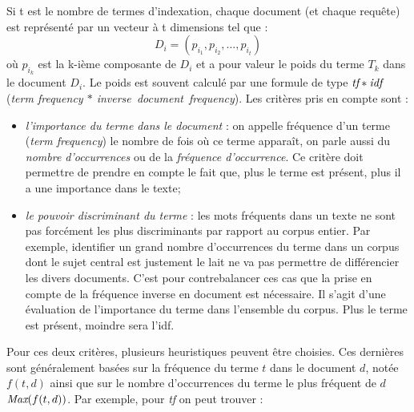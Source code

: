 Si t est le nombre de termes d'indexation, chaque document (et chaque
requête) est représenté par un vecteur à t dimensions tel que :
\begin{equation}
  \label{eq:vect-salton}
  D_i = (p_{i_1}, p_{i_2}, \ldots, p_{i_t})
\end{equation}
où $p_{i_k}$ est la k-ième composante de $D_i$ et a pour valeur le
poids du terme $T_k$ dans le document $D_i$. Le poids est souvent
calculé par une formule de type $\emph{tf}*\emph{idf}$ (\emph{term
  frequency $*$ inverse~document~frequency}). Les critères pris en compte sont :
\begin{itemize}
  
\item \emph{l'importance du terme dans le document} : on appelle
  fréquence d'un terme (\emph{term frequency}) le nombre de fois où ce
  terme apparaît, on parle aussi du \emph{nombre d'occurrences} ou de
  la \emph{fréquence d'occurrence}. Ce critère doit permettre de
  prendre en compte le fait que, plus le terme est présent, plus il a
  une importance dans le texte;
  
\item \emph{le pouvoir discriminant du terme} : les mots fréquents
  dans un texte ne sont pas forcément les plus discriminants par
  rapport au corpus entier. Par exemple, identifier un grand nombre
  d'occurrences du terme  dans un corpus dont le sujet
  central est justement le lait ne va pas permettre de différencier
  les divers documents. C'est pour contrebalancer ces cas que la prise
  en compte de la fréquence inverse en document est nécessaire. Il
  s'agit d'une évaluation de l'importance du terme dans l'ensemble du
  corpus. Plus le terme est présent, moindre sera l'idf.
\end{itemize}

Pour ces deux critères, plusieurs heuristiques peuvent être choisies.
Ces dernières sont généralement basées sur la fréquence du terme $t$
dans le document $d$, notée $f(t,d)$ ainsi que sur le nombre
d'occurrences du terme le plus fréquent de $d$ $\emph{Max}(f(t,d))$.
Par exemple, pour \emph{tf} on peut trouver :

